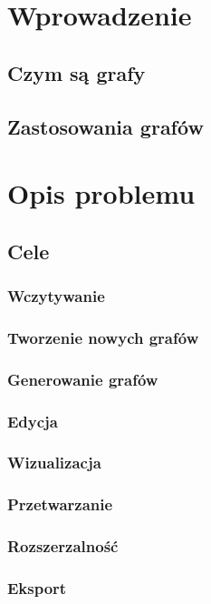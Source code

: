 \documentclass[a4paper,12pt]{report}
\begin{document}



\tableofcontents
\thispagestyle{empty}

\chapter{Wprowadzenie}
\section{Czym są grafy}
\section{Zastosowania grafów}

\chapter{Opis problemu}
\section{Cele}
\subsection{Wczytywanie}
\subsection{Tworzenie nowych grafów}
\subsection{Generowanie grafów}
\subsection{Edycja}
\subsection{Wizualizacja}
\subsection{Przetwarzanie}
\subsection{Rozszerzalność}
\subsection{Eksport}
\end{document}

